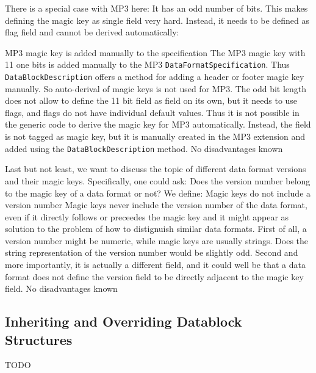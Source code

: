 There is a special case with MP3 here: It has an odd number of bits. This makes defining the magic key as single field very hard. Instead, it needs to be defined as flag field and cannot be derived automatically:

{%
MP3 magic key is added manually to the specification
}
{%
The MP3 magic key with 11 one bits is added manually to the MP3 \texttt{DataFormatSpecification}. Thus \texttt{DataBlockDescription} offers a method for adding a header or footer magic key manually. So auto-derival of magic keys is not used for MP3.
}
{%
The odd bit length does not allow to define the 11 bit field as field on its own, but it needs to use flags, and flags do not have individual default values. Thus it is not possible in the generic code to derive the magic key for MP3 automatically. Instead, the field is not tagged as magic key, but it is manually created in the MP3 extension and added using the \texttt{DataBlockDescription} method.
}
{%
No disadvantages known
}

Last but not least, we want to discuss the topic of different data format versions and their magic keys. Specifically, one could ask: Does the version number belong to the magic key of a data format or not? We define:
{%
Magic keys do not include a version number
}
{%
Magic keys never include the version number of the data format, even if it directly follows or preceedes the magic key and it might appear as solution to the problem of how to distignuish similar data formats.
}
{%
First of all, a version number might be numeric, while magic keys are usually strings. Does the string representation of the version number would be slightly odd. Second and more importantly, it is actually a different field, and it could well be that a data format does not define the version field to be directly adjacent to the magic key field.
}
{%
No disadvantages known
}

\subsection{Inheriting and Overriding Datablock Structures}%
\label{sec:InheritingandOverridingDatablockStructures}%

TODO



